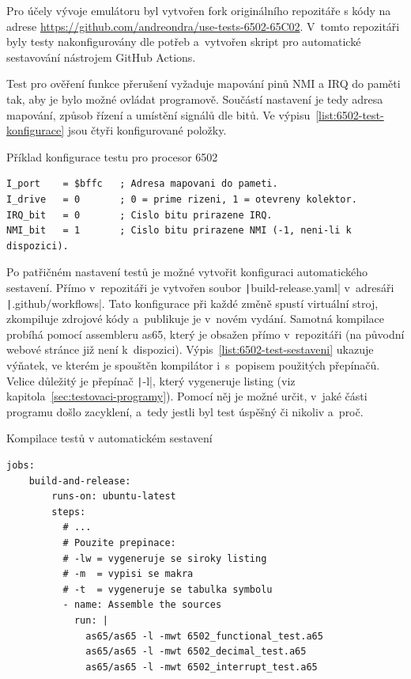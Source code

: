 Pro účely vývoje emulátoru byl vytvořen fork originálního repozitáře s kódy na adrese \url{https://github.com/andreondra/use-tests-6502-65C02}. V~tomto repozitáři byly testy nakonfigurovány dle potřeb a~vytvořen skript pro automatické sestavování nástrojem GitHub Actions.

Test pro ověření funkce přerušení vyžaduje mapování pinů NMI a IRQ do paměti tak, aby je bylo možné ovládat programově. Součástí nastavení je tedy adresa mapování, způsob řízení a umístění signálů dle bitů. Ve výpisu~\ref{list:6502-test-konfigurace} jsou čtyři konfigurované položky.

\begin{listing}
	\caption{Příklad konfigurace testu pro procesor 6502}
	\label{list:6502-test-konfigurace}
	\begin{verbatim}
I_port    = $bffc   ; Adresa mapovani do pameti.
I_drive   = 0       ; 0 = prime rizeni, 1 = otevreny kolektor.
IRQ_bit   = 0       ; Cislo bitu prirazene IRQ.
NMI_bit   = 1       ; Cislo bitu prirazene NMI (-1, neni-li k dispozici).
	\end{verbatim}
\end{listing}

Po patřičném nastavení testů je možné vytvořit konfiguraci automatického sestavení. Přímo v~repozitáři je vytvořen soubor \texttt|build-release.yaml| v~adresáři \texttt|.github/workflows|. Tato konfigurace při každé změně spustí virtuální stroj, zkompiluje zdrojové kódy a~publikuje je v~novém vydání. Samotná kompilace probíhá pomocí assembleru as65, který je obsažen přímo v~repozitáři (na původní webové stránce již není k~dispozici). Výpis~\ref{list:6502-test-sestaveni} ukazuje výňatek, ve kterém je spouštěn kompilátor i~s~popisem použitých přepínačů. Velice důležitý je přepínač \texttt|-l|, který vygeneruje listing (viz kapitola~\ref{sec:testovaci-programy}). Pomocí něj je možné určit, v~jaké části programu došlo zacyklení, a~tedy jestli byl test úspěšný či nikoliv a~proč.

\begin{listing}
	\caption{Kompilace testů v automatickém sestavení}
	\label{list:6502-test-sestaveni}
	\begin{verbatim}
jobs:
    build-and-release:
        runs-on: ubuntu-latest
        steps:
          # ...
          # Pouzite prepinace:
          # -lw = vygeneruje se siroky listing
          # -m  = vypisi se makra
          # -t  = vygeneruje se tabulka symbolu
          - name: Assemble the sources
            run: |
              as65/as65 -l -mwt 6502_functional_test.a65
              as65/as65 -l -mwt 6502_decimal_test.a65
              as65/as65 -l -mwt 6502_interrupt_test.a65
	\end{verbatim}
\end{listing}

